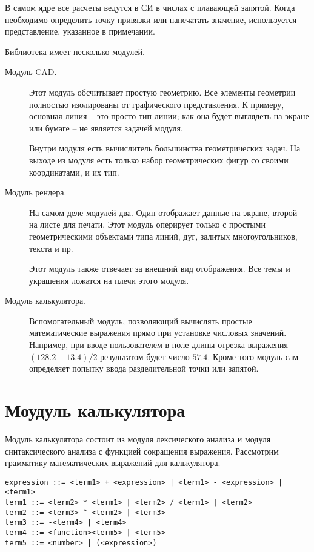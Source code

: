 \documentclass[a4paper, 12pt]{article}
\begin{document}
В самом ядре все расчеты ведутся в СИ в числах с плавающей запятой. Когда необходимо
определить точку привязки или напечатать значение, используется представление,
указанное в примечании.

Библиотека имеет несколько модулей.

\begin{description}
  \item[Модуль CAD.] Этот модуль обсчитывает простую геометрию. Все элементы геометрии
  полностью изолированы от графического представления. К примеру, основная линия -- это
  просто тип линии; как она будет выглядеть на экране или бумаге -- не является задачей
  модуля.

  Внутри модуля есть вычислитель большинства геометрических задач. На выходе из модуля
  есть только набор геометрических фигур со своими координатами, и их тип.

  \item[Модуль рендера.] На самом деле модулей два. Один отображает данные на экране,
  второй -- на листе для печати. Этот модуль оперирует только с простыми
  геометрическими объектами типа линий, дуг, залитых многоугольников, текста и пр.

  Этот модуль также отвечает за внешний вид отображения. Все темы и украшения ложатся
  на плечи этого модуля.

  \item[Модуль калькулятора.] Вспомогательный модуль, позволяющий вычислять простые
  математические выражения прямо при установке числовых значений. Например, при вводе
  пользователем в поле длины отрезка выражения $(128.2-13.4)/2$ результатом будет
  число $57.4$. Кроме того модуль сам определяет попытку ввода разделительной точки
  или запятой.
\end{description}

\section{Моудуль калькулятора}
Модуль калькулятора состоит из модуля лексического анализа и модуля синтаксического
анализа с функцией сокращения выражения. Рассмотрим грамматику математических выражений
для калькулятора.

\begin{verbatim}
expression ::= <term1> + <expression> | <term1> - <expression> | <term1>
term1 ::= <term2> * <term1> | <term2> / <term1> | <term2>
term2 ::= <term3> ^ <term2> | <term3>
term3 ::= -<term4> | <term4>
term4 ::= <function><term5> | <term5>
term5 ::= <number> | (<expression>)
\end{verbatim}
\end{document}
